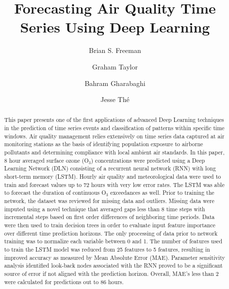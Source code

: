\documentclass[preprint,12pt,a4paper,authoryear]{elsarticle}
\title{Forecasting Air Quality Time Series Using Deep Learning}
\begin{document}
\maketitle

\begin{linenumbers}
\begin{frontmatter}

\author[add1]{Brian S. Freeman}

\author[add1]{Graham Taylor}

\author[add1]{Bahram Gharabaghi}

\author[add1,add2]{Jesse Th\'e }


\address[add1]{School of Engineering, University of Guelph, Guelph, Ontario, N1G 2W1, Canada}
\address[add2]{Lakes Environmental, 170 Columbia St W, Waterloo, Ontario, N2L 3L3 Canada}


\begin{abstract}
This paper presents one of the first applications of advanced Deep Learning techniques in the prediction of time series events and classification of patterns within specific time windows. Air quality management relies extensively on time series data captured at air monitoring stations as the basis of identifying population exposure to airborne pollutants and determining compliance with local ambient air standards. In this paper, 8 hour averaged surface ozone (O$_{3}$) concentrations were predicted using a Deep Learning Network (DLN) consisting of a recurrent neural network (RNN) with long short-term memory (LSTM). Hourly air quality and meteorological data were used to train and forecast values up to 72 hours with very low error rates. The LSTM was able to forecast the duration of continuous O$_{3}$ exceedances as well. Prior to training the network, the dataset was reviewed for missing data and outliers. Missing data were imputed using a novel technique that averaged gaps less than 8 time steps with incremental steps based on first order differences of neighboring time periods. Data were then used to train decision trees in order to evaluate input feature importance over different time prediction horizons. The only processing of data prior to network training was to normalize each variable between 0 and 1. The number of features used to train the LSTM model was reduced from 25 features to 5 features, resulting in improved accuracy as measured by Mean Absolute Error (MAE). Parameter sensitivity analysis identified look-back nodes associated with the RNN proved to be a significant source of error if not aligned with the prediction horizon. Overall, MAE's less than 2 were calculated for predictions out to 86 hours. \\  


\end{abstract}
\end{frontmatter}
\end{linenumbers}
\end{document}

